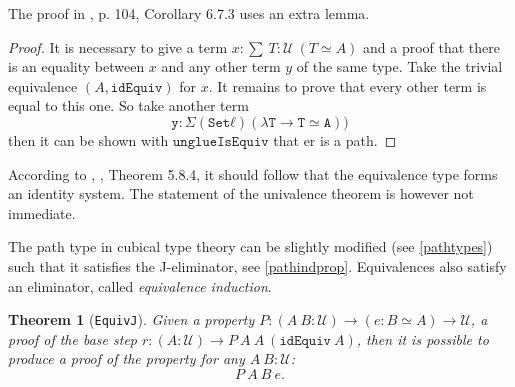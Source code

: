 \documentclass[12pt,a4paper,twoside,xetex]{book} %
\newcommand{\keyword}[1]{\emph{#1}\index{#1}}
\newtheorem{theorem}{Theorem}[section]
\newcommand{\op}[1]{\mathtt{#1}}
\newcommand{\type}{\mathcal{U}}
\begin{document}
The proof in \cite{Huber2016}, p. 104, Corollary 6.7.3 uses an extra lemma.

\begin{proof}
It is necessary to give a term $x : \sum \ T : \type \  \left( T \simeq 
A \right)$ and a proof that there is an equality between $x$ and any other term 
$y$ of the same type. Take the trivial equivalence  $(A, \op{idEquiv})$ for 
$x$. It remains to prove that every other term is equal to this one. So take 
another term $$\op{y : Σ (Set ℓ) (λ T → T ≃ A))}$$ then it can be shown with 
$\op{unglueIsEquiv}$ that er is a path.
\end{proof}


According to \cite{Huber2016}, \cite{Voevodsky2013}, Theorem 5.8.4, it should 
follow that the equivalence type forms an identity system. The statement of the 
univalence theorem is however not immediate.

The path type in cubical type theory can be slightly modified (see 
\cref{pathtypes}) such that it satisfies the J-eliminator, see 
\cref{pathindprop}. Equivalences also satisfy an eliminator, called 
\keyword{equivalence induction}. 

\begin{theorem}[\texttt{EquivJ}]
Given a property $P: (A \ B : \mathcal{U}) \rightarrow (e : B \simeq A) 
\rightarrow \mathcal{U}$, a proof of the base step $r : (A : \mathcal{U}) 
\rightarrow P \ A\ A \ (\texttt{idEquiv} \ A)$, then it is possible to produce 
a proof of the property for any $A \ B: \mathcal{U}$: $$ P\  A \ B\ e.$$
\end{theorem}
\end{document}
